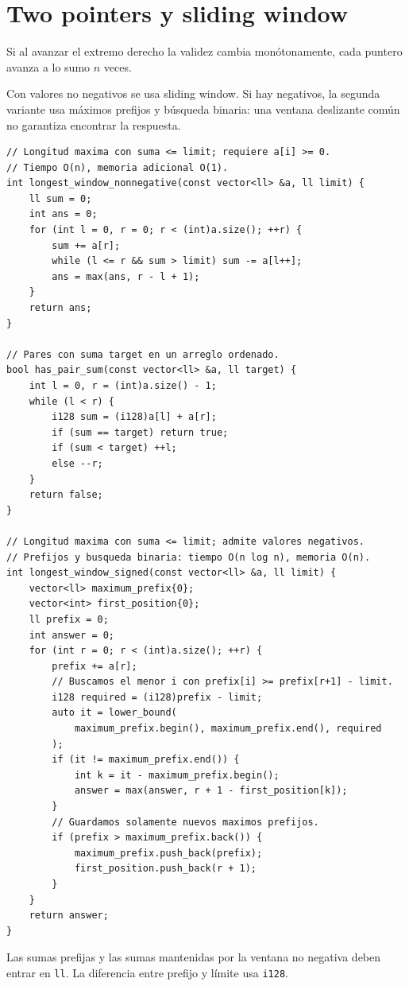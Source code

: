\section{Two pointers y sliding window}

Si al avanzar el extremo derecho la validez cambia mon\'otonamente, cada
puntero avanza a lo sumo $n$ veces.

Con valores no negativos se usa sliding window. Si hay negativos, la segunda
variante usa m\'aximos prefijos y b\'usqueda binaria: una ventana deslizante
com\'un no garantiza encontrar la respuesta.


\begin{lstlisting}[style=cpp]
// Longitud maxima con suma <= limit; requiere a[i] >= 0.
// Tiempo O(n), memoria adicional O(1).
int longest_window_nonnegative(const vector<ll> &a, ll limit) {
    ll sum = 0;
    int ans = 0;
    for (int l = 0, r = 0; r < (int)a.size(); ++r) {
        sum += a[r];
        while (l <= r && sum > limit) sum -= a[l++];
        ans = max(ans, r - l + 1);
    }
    return ans;
}

// Pares con suma target en un arreglo ordenado.
bool has_pair_sum(const vector<ll> &a, ll target) {
    int l = 0, r = (int)a.size() - 1;
    while (l < r) {
        i128 sum = (i128)a[l] + a[r];
        if (sum == target) return true;
        if (sum < target) ++l;
        else --r;
    }
    return false;
}

// Longitud maxima con suma <= limit; admite valores negativos.
// Prefijos y busqueda binaria: tiempo O(n log n), memoria O(n).
int longest_window_signed(const vector<ll> &a, ll limit) {
    vector<ll> maximum_prefix{0};
    vector<int> first_position{0};
    ll prefix = 0;
    int answer = 0;
    for (int r = 0; r < (int)a.size(); ++r) {
        prefix += a[r];
        // Buscamos el menor i con prefix[i] >= prefix[r+1] - limit.
        i128 required = (i128)prefix - limit;
        auto it = lower_bound(
            maximum_prefix.begin(), maximum_prefix.end(), required
        );
        if (it != maximum_prefix.end()) {
            int k = it - maximum_prefix.begin();
            answer = max(answer, r + 1 - first_position[k]);
        }
        // Guardamos solamente nuevos maximos prefijos.
        if (prefix > maximum_prefix.back()) {
            maximum_prefix.push_back(prefix);
            first_position.push_back(r + 1);
        }
    }
    return answer;
}
\end{lstlisting}

Las sumas prefijas y las sumas mantenidas por la ventana no negativa deben
entrar en \texttt{ll}. La diferencia entre prefijo y l\'imite usa \texttt{i128}.
